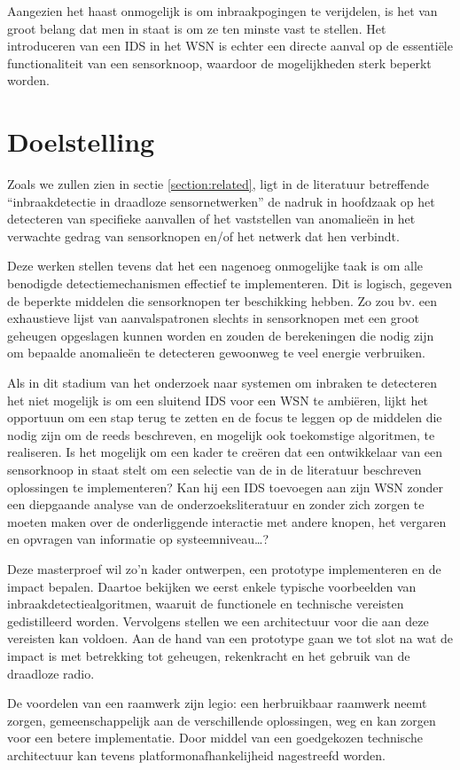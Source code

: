 Aangezien het haast onmogelijk is om inbraakpogingen te verijdelen, is het van
groot belang dat men in staat is om ze ten minste vast te stellen. Het
introduceren van een IDS in het WSN is echter een directe aanval op de
essenti\"ele functionaliteit van een sensorknoop, waardoor de mogelijkheden
sterk beperkt worden.

\section{Doelstelling}
\label{section:doelstelling}

Zoals we zullen zien in sectie \ref{section:related}, ligt in de literatuur
betreffende ``inbraakdetectie in draadloze sensornetwerken'' de nadruk in
hoofdzaak op het detecteren van specifieke aanvallen of het vaststellen van
anomalie\"en in het verwachte gedrag van sensorknopen en/of het netwerk dat hen
verbindt.

Deze werken stellen tevens dat het een nagenoeg onmogelijke taak is om alle
benodigde detectiemechanismen effectief te implementeren. Dit is logisch,
gegeven de beperkte middelen die sensorknopen ter beschikking hebben. Zo zou
bv. een exhaustieve lijst van aanvalspatronen slechts in sensorknopen met een
groot geheugen opgeslagen kunnen worden en zouden de berekeningen die nodig
zijn om bepaalde anomalie\"en te detecteren gewoonweg te veel energie
verbruiken.

Als in dit stadium van het onderzoek naar systemen om inbraken te detecteren
het niet mogelijk is om een sluitend IDS voor een WSN te ambi\"eren, lijkt het
opportuun om een stap terug te zetten en de focus te leggen op de middelen die
nodig zijn om de reeds beschreven, en mogelijk ook toekomstige algoritmen, te
realiseren. Is het mogelijk om een kader te cre\"eren dat een ontwikkelaar van
een sensorknoop in staat stelt om een selectie van de in de literatuur
beschreven oplossingen te implementeren? Kan hij een IDS toevoegen aan zijn WSN
zonder een diepgaande analyse van de onderzoeksliteratuur en zonder zich zorgen
te moeten maken over de onderliggende interactie met andere knopen, het
vergaren en opvragen van informatie op systeemniveau\dots?

Deze masterproef wil zo'n kader ontwerpen, een prototype implementeren en de
impact bepalen. Daartoe bekijken we eerst enkele typische voorbeelden van
inbraakdetectiealgoritmen, waaruit de functionele en technische vereisten
gedistilleerd worden. Vervolgens stellen we een architectuur voor die aan deze
vereisten kan voldoen. Aan de hand van een prototype gaan we tot slot na wat de
impact is met betrekking tot geheugen, rekenkracht en het gebruik van de
draadloze radio.

De voordelen van een raamwerk zijn legio: een herbruikbaar raamwerk neemt
zorgen, gemeenschappelijk aan de verschillende oplossingen, weg en kan zorgen
voor een betere implementatie. Door middel van een goedgekozen technische
architectuur kan tevens platformonafhankelijheid nagestreefd worden.
